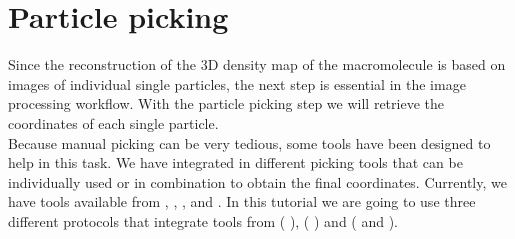 \section{Particle picking}

Since the reconstruction of the 3D density map of the macromolecule is based on images of individual single particles, the next step is essential in the image processing workflow. With the particle picking step we will retrieve the coordinates of each single particle.\\

Because manual picking can be very tedious, some tools have been designed to help in this task. We have integrated in \scipion different picking tools that can be individually used or in combination to obtain the final coordinates. Currently, we have tools available from , , ,  and . In this tutorial we are going to use three different protocols that integrate tools from  ( \citep{relion32018}),  ( \citep{cryolo2019}) and  ( and  \citep{sorzano2013semiautomatic}).\\

